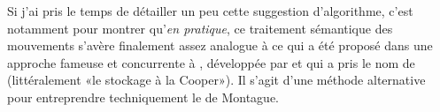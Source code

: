 
Si j'ai pris le temps de détailler un peu cette suggestion d'algorithme, c'est notamment pour montrer qu'\emph{en pratique}, ce traitement sémantique des mouvements s'avère finalement assez analogue à ce qui a été proposé dans une approche fameuse et concurrente à , développée par 
\citet{Cooper:75,Cooper:83} et qui a pris le nom de 
 (littéralement «le stockage à la Cooper»).  Il s'agit d'une méthode alternative pour entreprendre techniquement le  de Montague.


